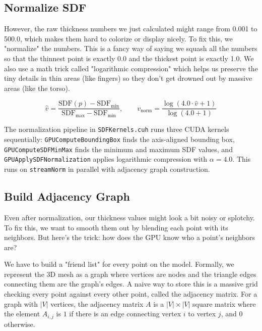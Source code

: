 \subsection{Normalize SDF}

However, the raw thickness numbers we just calculated might range from 0.001 to 500.0, which makes them hard to colorize or display nicely. To fix this, we "normalize" the numbers. This is a fancy way of saying we squash all the numbers so that the thinnest point is exactly 0.0 and the thickest point is exactly 1.0. We also use a math trick called "logarithmic compression" which helps us preserve the tiny details in thin areas (like fingers) so they don't get drowned out by massive areas (like the torso).

\begin{equation}
    \hat{v} = \frac{\mathrm{SDF}(p) - \mathrm{SDF}_{\min}}{\mathrm{SDF}_{\max} - \mathrm{SDF}_{\min}}, \qquad
    v_{\mathrm{norm}} = \frac{\log(4.0 \cdot \hat{v} + 1)}{\log(4.0 + 1)}
\end{equation}

The normalization pipeline in \texttt{SDFKernels.cuh} runs three CUDA kernels sequentially: \texttt{GPUComputeBoundingBox} finds the axis-aligned bounding box, \texttt{GPUComputeSDFMinMax} finds the minimum and maximum SDF values, and \texttt{GPUApplySDFNormalization} applies logarithmic compression with $\alpha = 4.0$. This runs on \texttt{streamNorm} in parallel with adjacency graph construction.

\subsection{Build Adjacency Graph}

Even after normalization, our thickness values might look a bit noisy or splotchy. To fix this, we want to smooth them out by blending each point with its neighbors. But here's the trick: how does the GPU know who a point's neighbors are? 

We have to build a "friend list" for every point on the model. Formally, we represent the 3D mesh as a graph where vertices are nodes and the triangle edges connecting them are the graph's edges. A naive way to store this is a massive grid checking every point against every other point, called the adjacency matrix. For a graph with $|V|$ vertices, the adjacency matrix $A$ is a $|V| \times |V|$ square matrix where the element $A_{i,j}$ is $1$ if there is an edge connecting vertex $i$ to vertex $j$, and $0$ otherwise.

